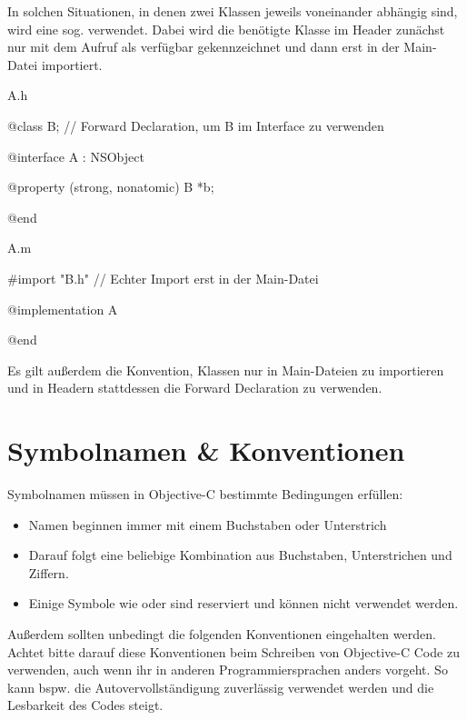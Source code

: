 \documentclass[parskip=half, final]{scrreprt}
\begin{document}
In solchen Situationen, in denen zwei Klassen jeweils voneinander abhängig sind, wird eine sog.  verwendet. Dabei wird die benötigte Klasse im Header zunächst nur mit dem Aufruf  als verfügbar gekennzeichnet und dann erst in der Main-Datei importiert.

\begin{filecontent}{A.h}
\begin{objclst}
@class B; // Forward Declaration, um B im Interface zu verwenden

@interface A : NSObject

@property (strong, nonatomic) B *b;

@end
\end{objclst}
\end{filecontent}

\begin{filecontent}{A.m}
\begin{objclst}
#import "B.h" // Echter Import erst in der Main-Datei

@implementation A

@end
\end{objclst}
\end{filecontent}

Es gilt außerdem die Konvention, Klassen nur in Main-Dateien zu importieren und in Headern stattdessen die Forward Declaration zu verwenden.

\section{Symbolnamen \& Konventionen}\label{sec:konventionen}

Symbolnamen müssen in Objective-C bestimmte Bedingungen erfüllen:

\begin{itemize}
\item Namen beginnen immer mit einem Buchstaben oder Unterstrich \objc{_}
\item Darauf folgt eine beliebige Kombination aus Buchstaben, Unterstrichen und Ziffern.
\item Einige Symbole wie  oder  sind reserviert und können nicht verwendet werden.
\end{itemize}

Außerdem sollten unbedingt die folgenden Konventionen eingehalten werden. Achtet bitte darauf diese Konventionen beim Schreiben von Objective-C Code zu verwenden, auch wenn ihr in anderen Programmiersprachen anders vorgeht. So kann bspw. die Autovervollständigung zuverlässig verwendet werden und die Lesbarkeit des Codes steigt.
\end{document}
